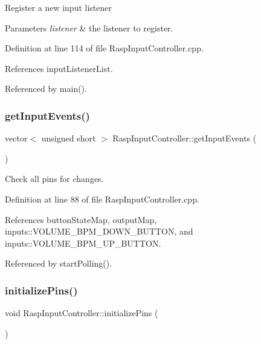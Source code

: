 Register a new input listener 
\begin{DoxyParams}{Parameters}
{\em listener} & the listener to register. \\
\hline
\end{DoxyParams}


Definition at line 114 of file Rasp\+Input\+Controller.\+cpp.



References input\+Listener\+List.



Referenced by main().

\mbox{\label{class_rasp_input_controller_a95a42703b4c0bca34ba966745bad5dff}} 
\subsubsection{\texorpdfstring{get\+Input\+Events()}{getInputEvents()}}
{\footnotesize\ttfamily vector$<$ unsigned short $>$ Rasp\+Input\+Controller\+::get\+Input\+Events (\begin{DoxyParamCaption}{ }\end{DoxyParamCaption})\hspace{0.3cm}{\ttfamily [private]}}



Check all pins for changes. 



Definition at line 88 of file Rasp\+Input\+Controller.\+cpp.



References button\+State\+Map, output\+Map, inputs\+::\+V\+O\+L\+U\+M\+E\+\_\+\+B\+P\+M\+\_\+\+D\+O\+W\+N\+\_\+\+B\+U\+T\+T\+ON, and inputs\+::\+V\+O\+L\+U\+M\+E\+\_\+\+B\+P\+M\+\_\+\+U\+P\+\_\+\+B\+U\+T\+T\+ON.



Referenced by start\+Polling().

\mbox{\label{class_rasp_input_controller_a5ffc6f68b0c74f31a9b595ff8acc49f1}} 
\subsubsection{\texorpdfstring{initialize\+Pins()}{initializePins()}}
{\footnotesize\ttfamily void Rasp\+Input\+Controller\+::initialize\+Pins (\begin{DoxyParamCaption}{ }\end{DoxyParamCaption})\hspace{0.3cm}{\ttfamily [private]}}



